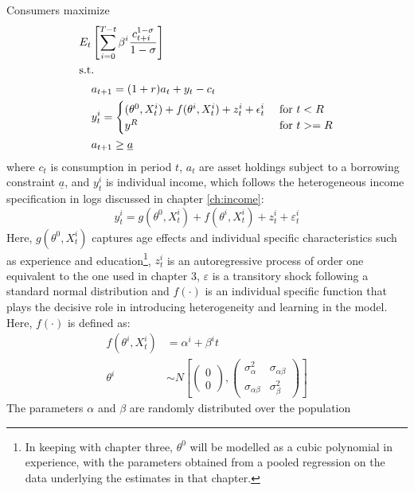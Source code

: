 Consumers maximize
\begin{align}
E_t &\left[ \sum_{i=0}^{T-t} \beta^{i} \frac{c_{t+i}^{1-\sigma}}{1-\sigma} \right] \label{eq:maxprob} \\
\intertext{s.t. } &a_{t+1} = (1+r)a_t + y_t - c_t \label{eq:bc} \\
				  &y_{t}^i = \begin{cases} (\theta^0, X_t^i) + f(\theta^i, X_t^i) + z_t^i + \epsilon_t^i \label{eq:incproc} &  \text{ for } t<R \\
                                           y^R & \text{ for } t>= R
                             \end{cases} \\
  				  &a_{t+1} \geq \underline{a} \label{eq:borrcons} 
\end{align}
where $c_t$ is consumption in period $t$, $a_t$ are asset holdings subject to 
a borrowing constraint  $\underline{a}$, and $y_t^i$ is individual 
income, which follows the heterogeneous income specification in logs discussed
in chapter \ref{ch:income}: 
\begin{equation*}
y_{t}^i = g(\theta^0, X_t^i) + f(\theta^i, X_t^i) + z_t^i + \varepsilon_t^i 
\end{equation*}
Here, $g(\theta^0, X_t^i)$ captures age effects and individual specific 
characteristics such as experience and education\footnote{In keeping with chapter three, 
$\theta^0$ will be modelled as a cubic polynomial in experience, with the parameters
obtained from a pooled regression on the data underlying the estimates in that 
chapter.}, $z_t^i$ is an autoregressive process of order one equivalent to 
the one used in chapter 3, $\varepsilon$ is a transitory shock following a standard normal 
distribution and $f(\cdot)$ is an individual specific function that plays the decisive
role in introducing heterogeneity and learning in the model. Here, $f(\cdot)$ 
is defined as:
\begin{align*}
f(\theta^i, X_t^i) &= \alpha^i + \beta^i t \\
\theta^i &\sim N \left[ \begin{pmatrix} 0 \\ 0 \end{pmatrix}, \begin{pmatrix} \sigma_{\alpha}^2 & \sigma_{\alpha \beta} \\ \sigma_{\alpha \beta} & \sigma_{\beta}^2 \end{pmatrix} \right]
\end{align*}
The parameters $\alpha$ and $\beta$ are randomly distributed over the population 
